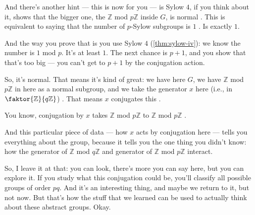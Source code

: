 \begin{speech}[00:31:07 - 00:32:56]
And there's another hint --- this is now for you --- is Sylow $4$, if you think about it, shows that the bigger one, the $\mathbb{Z}$ mod $p\mathbb{Z}$ inside $G$, is normal . This is equivalent to saying that the number of $p$-Sylow subgroups is $1$ . Is exactly $1$.

And the way you prove that is you use Sylow $4$ (\cref{thm:sylow-iv}): we know the number is $1$ mod $p$. It's at least $1$. The next chance is $p + 1$, and you show that that's too big --- you can't get to $p + 1$ by the conjugation action.

So, it's normal. That means it's kind of great: we have here $G$, we have $\mathbb{Z}$ mod $p\mathbb{Z}$ in here as a normal subgroup, and we take the generator $x$ here (i.e., in $\faktor{\mathbb{Z}}{q\mathbb{Z}}$) . That means $x$ conjugates this .

You know, conjugation by $x$ takes $\mathbb{Z}$ mod $p\mathbb{Z}$ to $\mathbb{Z}$ mod $p\mathbb{Z}$ .

And this particular piece of data --- how $x$ acts by conjugation here --- tells you everything about the group, because it tells you the one thing you didn't know: how the generator of $\mathbb{Z}$ mod $q\mathbb{Z}$ and generator of $\mathbb{Z}$ mod $p\mathbb{Z}$ interact.

So, I leave it at that: you can look, there's more you can say here, but you can explore it. If you study what this conjugation could be, you'll classify all possible groups of order $p q$. And it's an interesting thing, and maybe we return to it, but not now. But that's how the stuff that we learned can be used to actually think about these abstract groups. Okay.
\end{speech}

